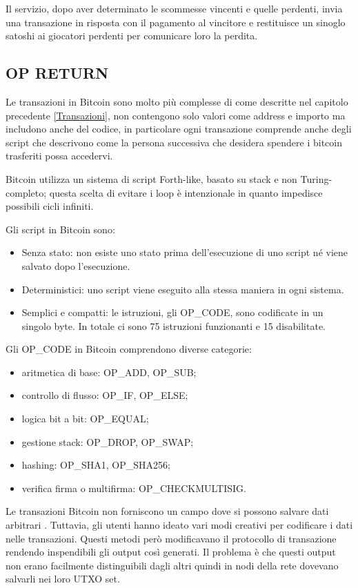 Il servizio, dopo aver determinato le scommesse vincenti e quelle perdenti, invia una transazione in risposta con il pagamento al vincitore e restituisce un sinoglo satoshi ai giocatori perdenti per comunicare loro la perdita.
\subsection{OP RETURN}
Le transazioni in Bitcoin sono molto più complesse \cite{script} di come descritte nel capitolo precedente \ref{Transazioni}, non contengono solo valori come address e importo ma includono anche del codice, in particolare ogni transazione comprende anche degli script che descrivono come la persona successiva che desidera spendere i bitcoin trasferiti possa accedervi. 

Bitcoin utilizza un sistema di script Forth-like, basato su stack e non Turing-completo; questa scelta di evitare i loop è intenzionale in quanto impedisce possibili cicli infiniti. 

Gli script \cite{opcode} in Bitcoin sono:
\begin{itemize}
    \item Senza stato: non esiste uno stato prima dell'esecuzione di uno script né viene salvato dopo l'esecuzione.
    \item Deterministici: uno script viene eseguito alla stessa maniera in ogni sistema.
    \item Semplici e compatti: le istruzioni, gli OP\_CODE, sono codificate in un singolo byte. In totale ci sono 75 istruzioni funzionanti e 15 disabilitate.
\end{itemize}
Gli OP\_CODE in Bitcoin comprendono diverse categorie:
\begin{itemize}
    \item aritmetica di base: OP\_ADD, OP\_SUB;
    \item controllo di flusso: OP\_IF, OP\_ELSE;
    \item logica bit a bit: OP\_EQUAL;
    \item gestione stack: OP\_DROP, OP\_SWAP;
    \item hashing: OP\_SHA1, OP\_SHA256;
    \item verifica firma o multifirma: OP\_CHECKMULTISIG.
\end{itemize}

Le transazioni Bitcoin non forniscono un campo dove si possono salvare dati arbitrari \cite{arbdata}. Tuttavia, gli utenti hanno ideato vari modi creativi per codificare i dati nelle transazioni. Questi metodi però modificavano il protocollo di transazione rendendo inspendibili gli output così generati. Il problema è che questi output non erano facilmente distinguibili dagli altri quindi in nodi della rete dovevano salvarli nei loro UTXO set.

